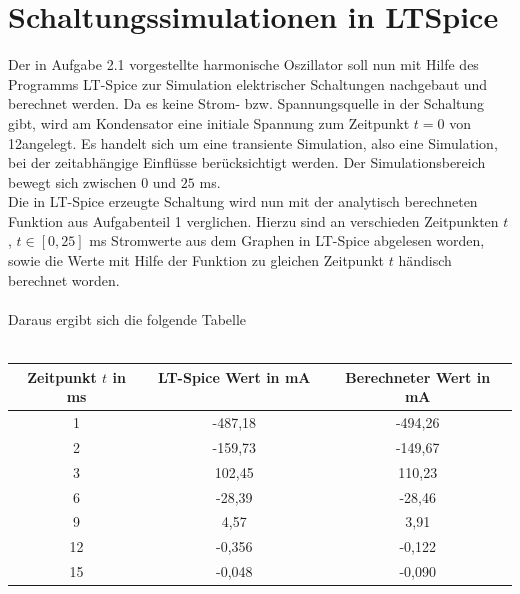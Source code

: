 \section{Schaltungssimulationen in LTSpice}\label{sec:ag2.2}
Der in Aufgabe 2.1 vorgestellte harmonische Oszillator soll nun mit Hilfe des Programms \glqq LT-Spice\grqq{} zur Simulation elektrischer Schaltungen nachgebaut und berechnet werden. Da es keine Strom- bzw. Spannungsquelle in der Schaltung gibt, wird am Kondensator eine initiale Spannung zum Zeitpunkt $t = 0$ von 12\volt angelegt. Es handelt sich um eine transiente Simulation, also eine Simulation, bei der zeitabhängige Einflüsse berücksichtigt werden. Der Simulationsbereich bewegt sich zwischen $0$ und $25$ \si{\milli\second}. \\
Die in LT-Spice erzeugte Schaltung wird nun mit der analytisch berechneten Funktion aus Aufgabenteil 1 verglichen. Hierzu sind an verschieden Zeitpunkten $t$ , $t \in [0,25]$ \si{\milli\second} Stromwerte aus dem Graphen in LT-Spice abgelesen worden, sowie die Werte mit Hilfe der Funktion zu gleichen Zeitpunkt $t$ händisch berechnet worden.\\ \\
Daraus ergibt sich die folgende Tabelle\\ \\
\begin{table}[h]
	\centering
	\begin{tabular}[h]{c|c|c}
		Zeitpunkt $t$ in \si{\milli\second} & LT-Spice Wert in \si{\milli\ampere} \ & Berechneter Wert in \si{\milli\ampere} \\
		\hline
		1 & -487,18 & -494,26 \\
		2 & -159,73 & -149,67\\
		3 & 102,45 & 110,23\\
		6 & -28,39 & -28,46\\
		9 & 4,57 & 3,91\\
		12 & -0,356 & -0,122\\
		15 & -0,048 & -0,090\\
	\end{tabular}
\end{table}\\
\\

